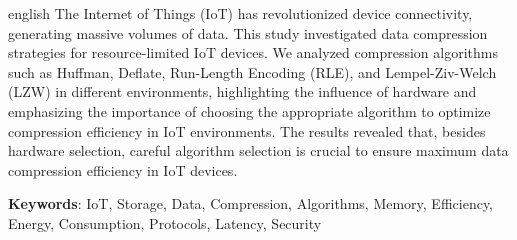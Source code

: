 \documentclass{TCC_UP}
\begin{document}


\begin{resumo}[Abstract]
\begin{otherlanguage*}{english}
The Internet of Things (IoT) has revolutionized device connectivity, generating massive volumes of data. This study investigated data compression strategies for resource-limited IoT devices. We analyzed compression algorithms such as Huffman, Deflate, Run-Length Encoding (RLE), and Lempel-Ziv-Welch (LZW) in different environments, highlighting the influence of hardware and emphasizing the importance of choosing the appropriate algorithm to optimize compression efficiency in IoT environments. The results revealed that, besides hardware selection, careful algorithm selection is crucial to ensure maximum data compression efficiency in IoT devices.

\textbf{Keywords}: IoT, Storage, Data, Compression, Algorithms, Memory, Efficiency, Energy, Consumption, Protocols, Latency, Security
\end{otherlanguage*}
\end{resumo}


\end{document}
